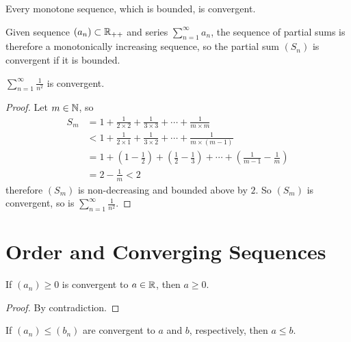 \documentclass[11pt]{article}
\newcommand{\ser}[2]{\sum_{{#2}=1}^\infty {#1}_{#2}}
\begin{document}
        \begin{theorem}
            Every monotone sequence, which is bounded, is convergent.
        \end{theorem}
        
        \begin{corollary}
            Given sequence $(a_n) \subset \mathbb{R}_{++}$ and series $\ser{a}{n}$, the sequence of partial sums is therefore a monotonically increasing sequence, so the partial sum $(S_n)$ is convergent if it is bounded.
        \end{corollary}
        
        \begin{example}
            $\sum_{n=1}^\infty \frac{1}{n^2}$ is convergent.
        \end{example}
        
        \begin{proof}
            Let $m \in \mathbb{N}$, so
            \begin{align}
                S_m &= 1 + \frac{1}{2\times 2} + \frac{1}{3 \times 3} + \cdots + \frac{1}{m \times m} \\
                &< 1 + \frac{1}{2\times 1} + \frac{1}{3\times 2} + \cdots + \frac{1}{m \times (m-1)} \\
                &= 1 + (1-\frac{1}{2}) + (\frac{1}{2} - \frac{1}{3}) + \cdots + (\frac{1}{m-1} - \frac{1}{m}) \\
                &= 2 - \frac{1}{m} < 2
            \end{align}
            therefore $(S_m)$ is non-decreasing and bounded above by $2$. So $(S_m)$ is convergent, so is  $\sum_{n=1}^\infty \frac{1}{n^2}$.
        \end{proof}
        
	\section{Order and Converging Sequences}
		\begin{proposition}
			If $(a_n) \geq 0$ is convergent to $a \in \mathbb{R}$, then $a \geq 0$.
		\end{proposition}
		
		\begin{proof}
			By contradiction.
		\end{proof}
		
		\begin{proposition}
			If $(a_n) \leq (b_n)$ are convergent to $a$ and $b$, respectively, then $a \leq b$.
		\end{proposition}
		
\end{document}
